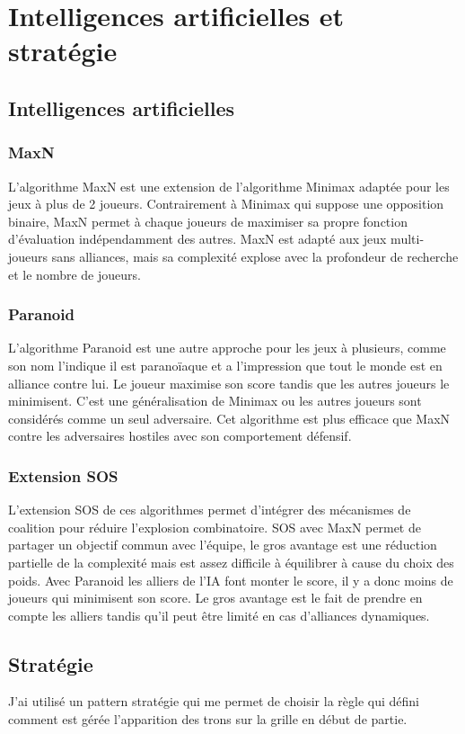 \documentclass[a4paper,12pt]{article}
\begin{document}
\section{Intelligences artificielles et stratégie}
\subsection{Intelligences artificielles}
\subsubsection{MaxN}
L'algorithme MaxN est une extension de l'algorithme Minimax adaptée pour les jeux à plus de 2 joueurs. Contrairement à Minimax qui suppose une opposition binaire, MaxN permet à chaque joueurs de maximiser sa propre fonction d'évaluation indépendamment des autres.
MaxN est adapté aux jeux multi-joueurs sans alliances, mais sa complexité explose avec la profondeur de recherche et le nombre de joueurs.
\subsubsection{Paranoid}
L'algorithme Paranoid est une autre approche pour les jeux à plusieurs, comme son nom l'indique il est paranoïaque et a l'impression que tout le monde est en alliance contre lui. Le joueur maximise son score tandis que les autres joueurs le minimisent. C'est une généralisation de Minimax ou les autres joueurs sont considérés comme un seul adversaire. Cet algorithme est plus efficace que MaxN contre les adversaires hostiles avec son comportement défensif.
\subsubsection{Extension SOS}
L'extension SOS de ces algorithmes permet d'intégrer des mécanismes de coalition pour réduire l'explosion combinatoire. 
SOS avec MaxN permet de partager un objectif commun avec l'équipe, le gros avantage est une réduction partielle de la complexité mais est assez difficile à équilibrer à cause du choix des poids.
Avec Paranoid les alliers de l'IA font monter le score, il y a donc moins de joueurs qui minimisent son score. Le gros avantage est le fait de prendre en compte les alliers tandis qu'il peut être limité en cas d'alliances dynamiques.
\subsection{Stratégie}
J'ai utilisé un pattern stratégie qui me permet de choisir la règle qui défini comment est gérée l'apparition des trons sur la grille en début de partie.
\end{document}
